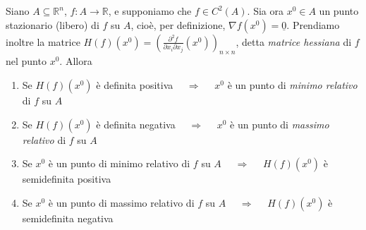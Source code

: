 \begin{thm}
Siano $A \subseteq \mathbb{R}^n$, $f : A \longrightarrow \mathbb{R}$, e supponiamo che $f \in C^2(A)$. Sia ora $x^0 \in A$ un punto stazionario (libero) di $f$ su $A$, cioè, per definizione, $\nabla f (x^0) = \underline{0}$. Prendiamo inoltre la matrice $\displaystyle H(f)(x^0) = \left( \frac{\partial^2 f}{\partial x_i \partial x_j} (x^0) \right)_{n \times n}$, detta \emph{matrice hessiana} di $f$ nel punto $x^0$. Allora
\begin{enumerate}[labelindent=\parindent,leftmargin=*,label=\textnormal{(\roman*)},start=1]
\item Se $H(f)(x^0)$ è definita positiva $\quad \Longrightarrow \quad$ $x^0$ è un punto di \emph{minimo relativo} di $f$ su $A$
\item Se $H(f)(x^0)$ è definita negativa $\quad \Longrightarrow \quad$ $x^0$ è un punto di \emph{massimo relativo} di $f$ su $A$
\item Se $x^0$ è un punto di minimo relativo di $f$ su $A$ $\quad \Longrightarrow \quad$ $H(f)(x^0)$ è semidefinita positiva
\item Se $x^0$ è un punto di massimo relativo di $f$ su $A$ $\quad \Longrightarrow \quad$ $H(f)(x^0)$ è semidefinita negativa
\end{enumerate}
\end{thm}
